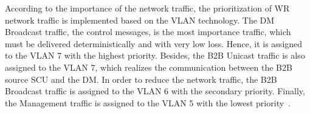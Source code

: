 According to the importance of the network traffic, the prioritization of WR network traffic is implemented based on the VLAN technology. The DM Broadcast traffic, the control messages, is the most importance traffic, which must be delivered  deterministically and with very low loss. Hence, it is assigned to the VLAN 7 with the highest priority. Besides, the B2B Unicast traffic is also assigned to the VLAN 7, which realizes the communication between the B2B source SCU and the DM. In order to reduce the network traffic, the B2B Broadcast traffic is assigned to the VLAN 6 with the secondary priority. Finally, the Management traffic is assigned to the VLAN 5 with the lowest priority~\cite{prados_testing_2016}.




